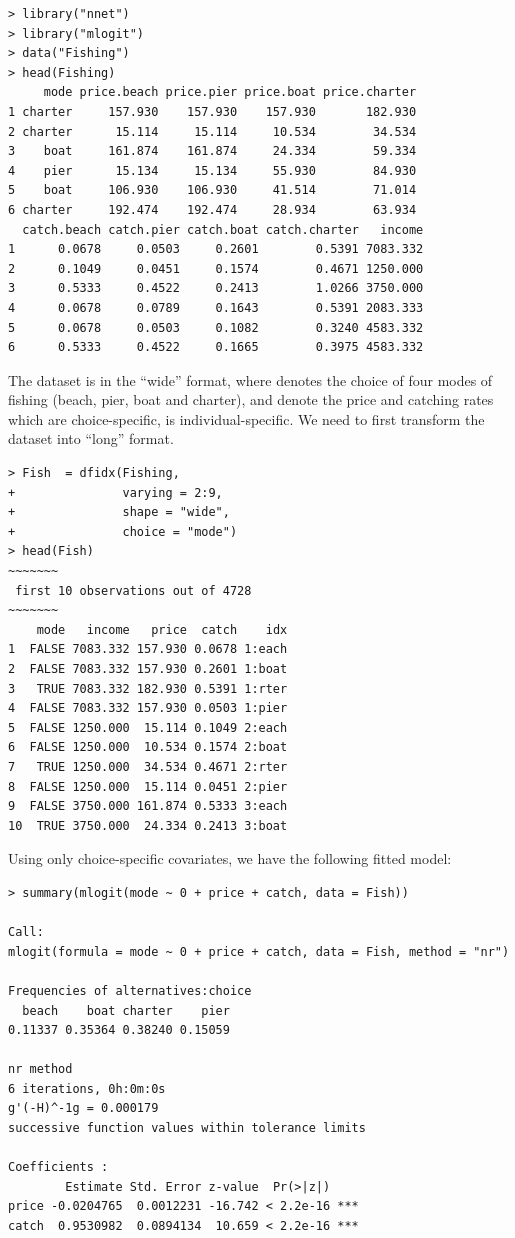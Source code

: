 \begin{lstlisting}
> library("nnet")
> library("mlogit")
> data("Fishing")
> head(Fishing)
     mode price.beach price.pier price.boat price.charter
1 charter     157.930    157.930    157.930       182.930
2 charter      15.114     15.114     10.534        34.534
3    boat     161.874    161.874     24.334        59.334
4    pier      15.134     15.134     55.930        84.930
5    boat     106.930    106.930     41.514        71.014
6 charter     192.474    192.474     28.934        63.934
  catch.beach catch.pier catch.boat catch.charter   income
1      0.0678     0.0503     0.2601        0.5391 7083.332
2      0.1049     0.0451     0.1574        0.4671 1250.000
3      0.5333     0.4522     0.2413        1.0266 3750.000
4      0.0678     0.0789     0.1643        0.5391 2083.333
5      0.0678     0.0503     0.1082        0.3240 4583.332
6      0.5333     0.4522     0.1665        0.3975 4583.332
\end{lstlisting}

The dataset  is in the ``wide'' format, where  denotes the choice of four modes of fishing (beach, pier, boat and charter),  and  denote the price and catching rates which are choice-specific,  is individual-specific. 
We need to first transform the dataset into ``long'' format.

\begin{lstlisting}
> Fish  = dfidx(Fishing, 
+               varying = 2:9, 
+               shape = "wide", 
+               choice = "mode")
> head(Fish)
~~~~~~~
 first 10 observations out of 4728 
~~~~~~~
    mode   income   price  catch    idx
1  FALSE 7083.332 157.930 0.0678 1:each
2  FALSE 7083.332 157.930 0.2601 1:boat
3   TRUE 7083.332 182.930 0.5391 1:rter
4  FALSE 7083.332 157.930 0.0503 1:pier
5  FALSE 1250.000  15.114 0.1049 2:each
6  FALSE 1250.000  10.534 0.1574 2:boat
7   TRUE 1250.000  34.534 0.4671 2:rter
8  FALSE 1250.000  15.114 0.0451 2:pier
9  FALSE 3750.000 161.874 0.5333 3:each
10  TRUE 3750.000  24.334 0.2413 3:boat
\end{lstlisting}

Using only choice-specific covariates, we have the following fitted model:

\begin{lstlisting}
> summary(mlogit(mode ~ 0 + price + catch, data = Fish))

Call:
mlogit(formula = mode ~ 0 + price + catch, data = Fish, method = "nr")

Frequencies of alternatives:choice
  beach    boat charter    pier 
0.11337 0.35364 0.38240 0.15059 

nr method
6 iterations, 0h:0m:0s 
g'(-H)^-1g = 0.000179 
successive function values within tolerance limits 

Coefficients :
        Estimate Std. Error z-value  Pr(>|z|)    
price -0.0204765  0.0012231 -16.742 < 2.2e-16 ***
catch  0.9530982  0.0894134  10.659 < 2.2e-16 ***
\end{lstlisting}

